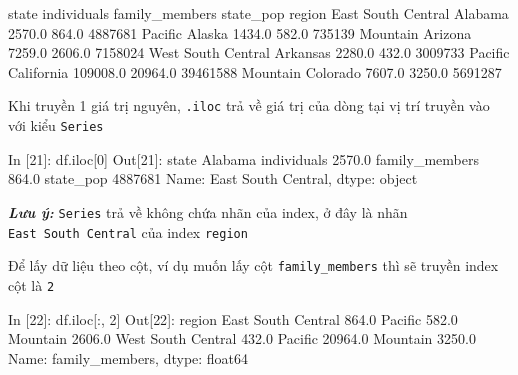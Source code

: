 \documentclass[
]{book}
\makeatletter
\newenvironment{Shaded}{\begin{snugshade}}{\end{snugshade}}
\newcommand{\BuiltInTok}[1]{#1}
\newcommand{\DecValTok}[1]{\textcolor[rgb]{0.00,0.00,0.81}{#1}}
\newcommand{\FloatTok}[1]{\textcolor[rgb]{0.00,0.00,0.81}{#1}}
\newcommand{\NormalTok}[1]{#1}
\newenvironment{kframe}{%
\medskip{}
\setlength{\fboxsep}{.8em}
 \def\at@end@of@kframe{}%
 \ifinner\ifhmode%
  \def\at@end@of@kframe{\end{minipage}}%
  \begin{minipage}{\columnwidth}%
 \fi\fi%
 \def\FrameCommand##1{\hskip\@totalleftmargin \hskip-\fboxsep
 \colorbox{shadecolor}{##1}\hskip-\fboxsep
     \hskip-\linewidth \hskip-\@totalleftmargin \hskip\columnwidth}%
 \MakeFramed {\advance\hsize-\width
   \@totalleftmargin\z@ \linewidth\hsize
   \@setminipage}}%
 {\par\unskip\endMakeFramed%
 \at@end@of@kframe}
\newenvironment{rmdblock}[1]
  {
  \begin{itemize}
  \renewcommand{\labelitemi}{
    \raisebox{-.7\height}[0pt][0pt]{
      {\setkeys{Gin}{width=3em,keepaspectratio}\texttt{[image: images/\#1]}}
    }
  }
  \setlength{\fboxsep}{1em}
  \begin{kframe}
  \item
  }
  {
  \end{kframe}
  \end{itemize}
  }
\newenvironment{rmdnote}
  {\begin{rmdblock}{note}}
  {\end{rmdblock}}
\makeatother
\begin{document}
\begin{Shaded}
\begin{Highlighting}[]
\NormalTok{                         state  individuals  family\_members  state\_pop}
\NormalTok{region                                                                }
\NormalTok{East South Central     Alabama       }\FloatTok{2570.0}           \FloatTok{864.0}    \DecValTok{4887681}
\NormalTok{Pacific                 Alaska       }\FloatTok{1434.0}           \FloatTok{582.0}     \DecValTok{735139}
\NormalTok{Mountain               Arizona       }\FloatTok{7259.0}          \FloatTok{2606.0}    \DecValTok{7158024}
\NormalTok{West South Central    Arkansas       }\FloatTok{2280.0}           \FloatTok{432.0}    \DecValTok{3009733}
\NormalTok{Pacific             California     }\FloatTok{109008.0}         \FloatTok{20964.0}   \DecValTok{39461588}
\NormalTok{Mountain              Colorado       }\FloatTok{7607.0}          \FloatTok{3250.0}    \DecValTok{5691287}
\end{Highlighting}
\end{Shaded}

Khi truyền 1 giá trị nguyên, \texttt{.iloc} trả về giá trị của dòng tại vị trí truyền vào với kiểu \texttt{Series}

\begin{Shaded}
\begin{Highlighting}[]
\NormalTok{In [}\DecValTok{21}\NormalTok{]: df.iloc[}\DecValTok{0}\NormalTok{]}
\NormalTok{Out[}\DecValTok{21}\NormalTok{]:}
\NormalTok{state             Alabama}
\NormalTok{individuals        }\FloatTok{2570.0}
\NormalTok{family\_members      }\FloatTok{864.0}
\NormalTok{state\_pop         }\DecValTok{4887681}
\NormalTok{Name: East South Central, dtype: }\BuiltInTok{object}
\end{Highlighting}
\end{Shaded}

\begin{rmdnote}
\textbf{\emph{Lưu ý:}}
\texttt{Series} trả về không chứa nhãn của index, ở đây là nhãn \texttt{East\ South\ Central} của index \texttt{region}
\end{rmdnote}

Để lấy dữ liệu theo cột, ví dụ muốn lấy cột \texttt{family\_members} thì sẽ truyền index cột là \texttt{2}

\begin{Shaded}
\begin{Highlighting}[]
\NormalTok{In [}\DecValTok{22}\NormalTok{]: df.iloc[:, }\DecValTok{2}\NormalTok{]}
\NormalTok{Out[}\DecValTok{22}\NormalTok{]:}
\NormalTok{region}
\NormalTok{East South Central      }\FloatTok{864.0}
\NormalTok{Pacific                 }\FloatTok{582.0}
\NormalTok{Mountain               }\FloatTok{2606.0}
\NormalTok{West South Central      }\FloatTok{432.0}
\NormalTok{Pacific               }\FloatTok{20964.0}
\NormalTok{Mountain               }\FloatTok{3250.0}
\NormalTok{Name: family\_members, dtype: float64}
\end{Highlighting}
\end{Shaded}
\end{document}
